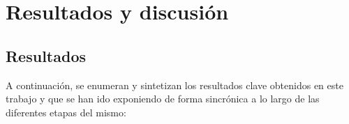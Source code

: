 \chapter{Resultados y discusión}
\label{chap:resultados}


\section{Resultados}

A continuación, se enumeran y sintetizan los resultados clave obtenidos en este trabajo y que se han ido exponiendo de forma sincrónica a lo largo de las diferentes etapas del mismo:


